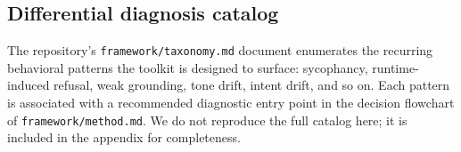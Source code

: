 \subsection{Differential diagnosis catalog}
\label{sec:taxonomy}

The repository's \texttt{framework/taxonomy.md} document enumerates the
recurring behavioral patterns the toolkit is designed to surface:
sycophancy, runtime-induced refusal, weak grounding, tone drift,
intent drift, and so on. Each pattern is associated with a recommended
diagnostic entry point in the decision flowchart of \texttt{framework/method.md}.
We do not reproduce the full catalog here; it is included in the
appendix for completeness.
